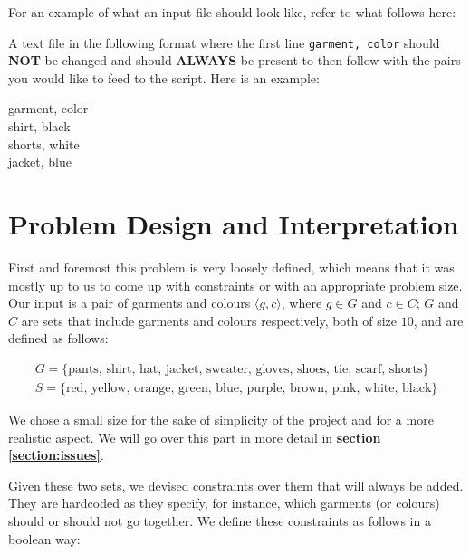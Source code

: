 \documentclass[12pt]{article}
\newcommand{\mygather}[1]{\begin{gather*} #1 \end{gather*}}
\begin{document}
For an example of what an input file should look like, refer to what follows here:

A text file in the following format where the first line \texttt{garment, color} should \textbf{NOT} be changed and should \textbf{ALWAYS} be present to then follow with the pairs you would like to feed to the script. Here is an example:

\begin{center}

	{
		\ttfamily
		garment, color\\
		shirt, black\\
		shorts, white\\
		jacket, blue\\
}
\end{center}

\section{Problem Design and Interpretation}\label{section:design}

    First and foremost this problem is very loosely defined, which means that it was mostly up to us to come up with constraints or with an appropriate problem size. Our input is a pair of garments and colours $\langle g, c \rangle$, where $g \in G$ and $c \in C$; $G$ and $C$ are sets that include garments and colours respectively, both of size $10$, and are defined as follows:

    \mygather{
        G = \{\text{pants, shirt, hat, jacket, sweater, gloves, shoes, tie, scarf, shorts} \} \\
        S = \{\text{red, yellow, orange, green, blue, purple, brown, pink, white, black} \}
    }

    We chose a small size for the sake of simplicity of the project and for a more realistic aspect. We will go over this part in more detail in \textbf{section \ref{section:issues}}.

    Given these two sets, we devised constraints over them that will always be added. They are hardcoded as they specify, for instance, which garments (or colours) should or should not go together.
    We define these constraints as follows in a boolean way:
\end{document}
